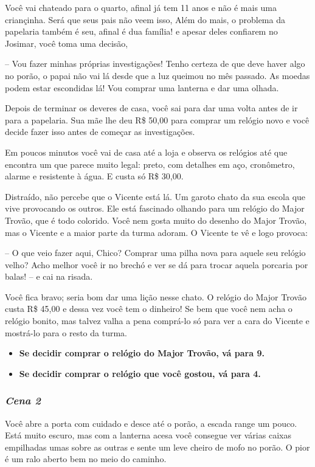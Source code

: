 Você vai chateado para o quarto, afinal já tem 11 anos e não é mais uma criançinha. Será que seus pais não veem isso, Além do mais, o problema da papelaria também é seu, afinal é dua família! e apesar deles confiarem no Josimar, você toma uma decisão,

-- Vou fazer minhas próprias investigações! Tenho certeza de que deve haver algo no porão, o papai não vai lá desde que a luz queimou no mês passado. As moedas podem estar escondidas lá! Vou comprar uma lanterna e dar uma olhada.

Depois de terminar os deveres de casa, você sai para dar uma volta antes de ir para a papelaria. Sua mãe lhe deu R\$ 50,00 para comprar um relógio novo e você decide fazer isso antes de começar as investigações.

Em poucos minutos você vai de casa até a loja e observa os relógios até que encontra um que parece muito legal: preto, com detalhes em aço, cronômetro, alarme e resistente à água. E custa só R\$ 30,00.

Distraído, não percebe que o Vicente está lá. Um garoto chato da sua escola que vive provocando os outros. Ele está fascinado olhando para um relógio do Major Trovão, que é todo colorido. Você nem gosta muito do desenho do Major Trovão, mas o Vicente e a maior parte da turma adoram. O Vicente te vê e logo provoca:

-- O que veio fazer aqui, Chico? Comprar uma pilha nova para aquele seu relógio velho? Acho melhor você ir no brechó e ver se dá para trocar aquela porcaria por balas!
-- e cai na risada.

Você fica bravo; seria bom dar uma lição nesse chato. O relógio do Major Trovão custa R\$ 45,00 e dessa vez você tem o dinheiro! Se bem que você nem acha o relógio bonito, mas talvez valha a pena comprá-lo só para ver a cara do Vicente e mostrá-lo para o resto da turma.

\begin{itemize}
	\item \textbf{Se decidir comprar o relógio do Major Trovão, vá para 9.}
	\item \textbf{Se decidir comprar o relógio que você gostou, vá para 4.}
\end{itemize}

\bigskip\medskip

\subsubsection{\textit{\textbf{Cena 2}}}
Você abre a porta com cuidado e desce até o porão, a escada range um pouco. Está muito escuro, mas com a lanterna acesa você consegue ver várias caixas empilhadas umas sobre as outras e sente um leve cheiro de mofo no porão. O pior é um ralo aberto bem no meio do caminho.

